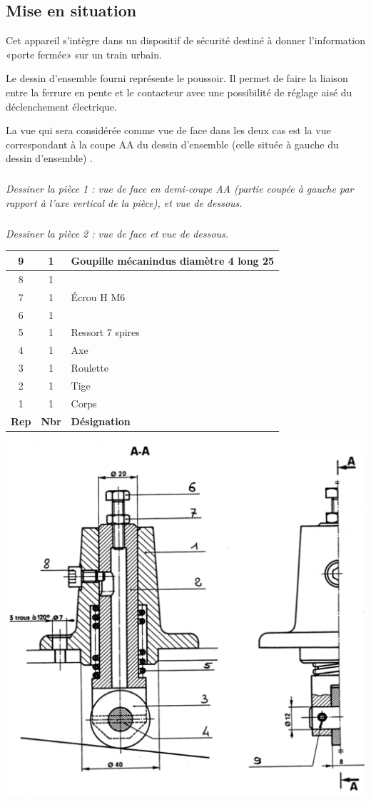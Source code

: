 \documentclass[10pt,fleqn]{article} %
\begin{document}
\else
\begin{multicols}{2}
\subsection*{Mise en situation}
Cet appareil s’intègre dans un dispositif de sécurité destiné à donner l’information «porte fermée» sur un train urbain.

Le dessin d’ensemble fourni représente le poussoir. Il permet de faire la liaison entre la ferrure en pente et le contacteur avec une possibilité de réglage aisé du déclenchement électrique.


La vue qui sera considérée comme vue de face dans les deux cas est la vue correspondant à la coupe AA du dessin d’ensemble (celle située à gauche du dessin d’ensemble) .

\subparagraph{}\textit{Dessiner la pièce 1 : vue de face en demi-coupe AA (partie coupée à gauche par rapport à l’axe vertical de la pièce), et vue de dessous.}

\subparagraph{}\textit{Dessiner la pièce 2 : vue de face et vue de dessous.}

\begin{center}
\begin{tabular}{|c|c|p{.6\linewidth}|}
\hline
9	&1&	Goupille mécanindus diamètre 4 long 25\\ \hline
8	&1&	\\ \hline
7	&1&	Écrou H M6\\ \hline
6	&1&	 \\ \hline
5	&1&	Ressort 7 spires\\ \hline
4	&1&	Axe \\ \hline
3	&1&	Roulette \\ \hline
2	&1&	Tige \\ \hline
1	&1&	Corps \\ \hline
\hline
\textbf{Rep} & \textbf{Nbr} & \textbf{Désignation} \\ \hline
\end{tabular}
\end{center}


\end{multicols}


\begin{center}
\includegraphics[width=.8\linewidth]{images/fig_02}
\end{center}
\fi
\end{document}
